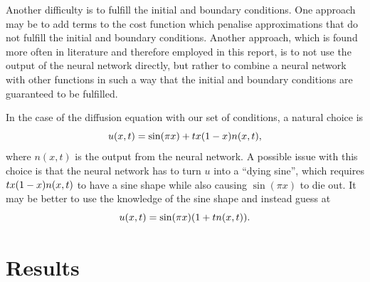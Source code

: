 \documentclass[11pt,british,a4paper]{article}
\numberwithin{equation}{section}
\begin{document}
Another difficulty is to fulfill the initial and boundary conditions. One approach may be to add terms to the cost function which penalise approximations that do not fulfill the initial and boundary conditions. Another approach, which is found more often in literature\cite{nnde} and therefore employed in this report, is to not use the output of the neural network directly, but rather to combine a neural network with other functions in such a way that the initial and boundary conditions are guaranteed to be fulfilled.

In the case of the diffusion equation with our set of conditions, a natural choice is
\begin{equation}
    u(x,t) = \sin(\pi x) + tx\qty(1-x)n(x,t),
\end{equation}
where \(n(x,t)\) is the output from the neural network. A possible issue with this choice is that the neural network has to turn \(u\) into a ``dying sine'', which requires \(tx\qty(1-x)n(x,t)\) to have a sine shape while also causing \(\sin(\pi x)\) to die out. It may be better to use the knowledge of the sine shape and instead guess at
\begin{equation}
    u(x,t) = \sin(\pi x)\qty(1+tn(x,t)).
\end{equation}

\section{Results}
\end{document}
